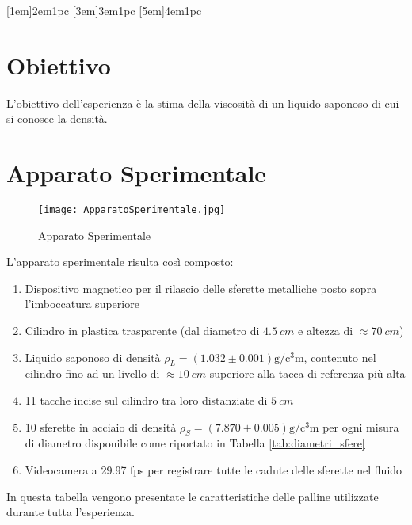 \documentclass[a4paper,11pt,oneside]{article}
\begin{document}


\clearpage

\tableofcontents
{}
\contentsmargin{6em}
[1em]{\bigskip}{2em}{1pc}
[3em]{\smallskip}{3em}{1pc}
[5em]{\smallskip}{4em}{1pc}
\newpage

\section{Obiettivo}
L'obiettivo dell'esperienza è la stima della viscosità di un liquido saponoso di cui si conosce la densità.

\section{Apparato Sperimentale}


\begin{wrapfigure}{l}{4cm}
    \texttt{[image: ApparatoSperimentale.jpg]}
    \label{fig:apparato_sperimentale}
    \caption{Apparato Sperimentale}
\end{wrapfigure}

L'apparato sperimentale risulta così composto:
\begin{enumerate}[label={\alph*.}]
    \item Dispositivo magnetico per il rilascio delle sferette metalliche posto sopra l'imboccatura superiore
    \item Cilindro in plastica trasparente (dal diametro di $\SI{4.5}{cm}$ e altezza di $\approx\SI{70}{cm}$)
    \item Liquido saponoso di densità ${\rho}_L=(1.032\pm0.001)\si{\gram\per\cubic\centi\metre}$, contenuto nel cilindro fino ad un livello di $\approx\SI{10}{cm}$ superiore alla tacca di referenza più alta
    \item 11 tacche incise sul cilindro tra loro distanziate di $\SI{5}{cm}$
    \item 10 sferette in acciaio di densità $\rho_S=(7.870\pm0.005)\si{\gram\per\cubic\centi\metre}$ per ogni misura di diametro disponibile come riportato in Tabella \ref{tab:diametri_sfere}
    \item Videocamera a 29.97 fps per registrare tutte le cadute delle sferette nel fluido 
\end{enumerate}
In questa tabella vengono presentate le caratteristiche delle palline utilizzate durante tutta l'esperienza.
\end{document}
